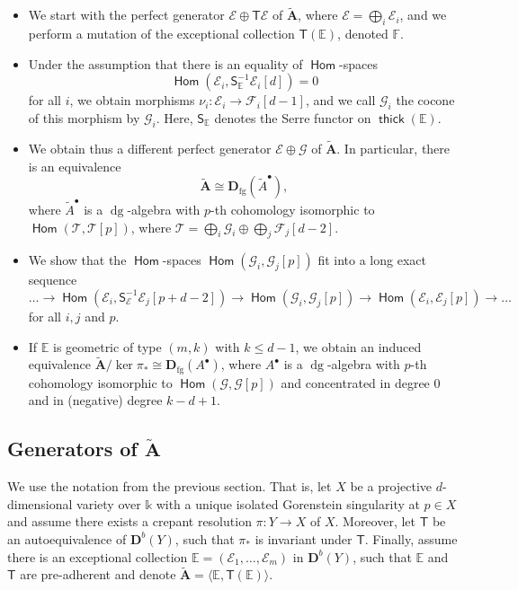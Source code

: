 \documentclass[a4paper,11pt, reqno]{amsart}
\def\E{\mathbb E}
\def\F{\mathbb F}
\def\AA{\mathbf A}
\def\DD{\mathbf D}
\def\sE{\mathscr{E}}
\def\sF{\mathscr{F}}
\def\sG{\mathscr{G}}
\def\sT{\mathscr{T}}
\def\dg{{\operatorname{dg}}}
\newcommand{\opname}[1]{\operatorname{\mathsf{#1}}}
\newcommand{\Hom}{\opname{Hom}}
\newcommand{\thick}{\opname{thick}\nolimits}
\def\Db{\DD^b}
\newcommand{\bS}{\mathsf{S}}
\newcommand{\bT}{\mathsf{T}}
\theoremstyle{plain}
\theoremstyle{definition}
\numberwithin{equation}{section}
\begin{document}
\begin{itemize}
    \item We start with the perfect generator $\sE \oplus \bT  \sE $ of $\tilde{\AA}$, where $\sE = \bigoplus_i \sE_i$, and we perform a mutation of the exceptional collection $\bT (\E )$, denoted $\F$.
    \item Under the assumption that there is an equality of $\Hom$-spaces 
    \[
\Hom ( \sE_i , \bS^{-1}_\E \sE_i [d] ) = 0
\]
    for all $i$,
    we obtain morphisms $\nu_i \colon \sE_i \to \sF_i [d-1]$, and we call $\sG_i$ the cocone of this morphism by $\sG_i$.
     Here, $\bS_\E$ denotes the Serre functor on $\thick ( \E )$.
    \item We obtain thus a different perfect generator $\sE \oplus \sG$  of $\tilde{\AA}$.
    In particular, 
    there is an equivalence 
    \[
    \tilde{\AA} \cong \DD_{\mathrm{fg}} ( \tilde{A}^\bullet ) ,
    \]
    where $\tilde{A}^\bullet$ is a $\dg$-algebra with $p$-th cohomology isomorphic to $\Hom ( \sT , \sT [p] )$, where $\sT = \bigoplus_i \sG_i \oplus \bigoplus_j \sF_j [d-2]$.
    \item We show that the $\Hom$-spaces $\Hom ( \sG_i , \sG_j [p] )$ fit into a long exact sequence 
    \[
    \ldots \to \Hom ( \sE_i , \bS^{-1}_\sE \sE_j [p+d-2] ) \to \Hom ( \sG_i , \sG_j [p] ) \to \Hom ( \sE_i , \sE_j [p] ) \to \ldots
    \]
    for all $i , j$ and $p$.
    \item If $\E$ is geometric of type $(m,k)$ with $k\leq d-1$, we obtain an induced equivalence $\tilde{\AA} / \ker\pi_\ast \cong \DD_{\mathrm{fg}} ( A^\bullet  )$, where $A^\bullet $ is a $\dg$-algebra with $p$-th cohomology isomorphic to $\Hom ( \sG , \sG [p] )$ and concentrated in degree $0$ and in (negative) degree $k-d+1$.
\end{itemize}




\subsection{Generators of \texorpdfstring{$\tilde{\AA}$}{ A\textasciicircum tilde}}
We use the notation from the previous section.
That is, let $X$ be a projective $d$-dimensional variety over $\mathbb{k}$ with a unique isolated Gorenstein singularity at $p \in X$ and assume there exists a crepant resolution $\pi \colon Y \to X$ of $X$.
Moreover, let $\bT$ be an autoequivalence of $\Db(Y)$, such that $\pi_\ast$ is invariant under $\bT $.
Finally, assume there is an exceptional collection $\E = (  \sE_1 , \ldots , \sE_m )$ in $\Db(Y)$, such that $\E$ and $\bT$ are pre-adherent and denote $\tilde{\AA} = \langle \E , \bT ( \E ) \rangle$.
\end{document}

